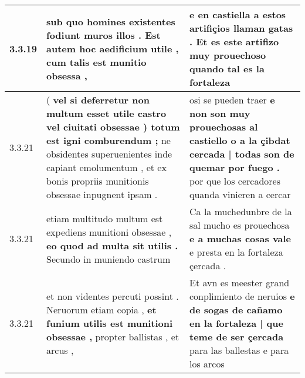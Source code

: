 \begin{tabular}{|p{1cm}|p{6.5cm}|p{6.5cm}|}
3.3.19 & sub quo homines existentes fodiunt muros illos . \textbf{ Est autem hoc aedificium utile , } cum talis est munitio obsessa , & e en castiella a estos artifiçios llaman gatas . \textbf{ Et es este artifizo muy prouechoso } quando tal es la fortaleza \\\hline
3.3.21 & ( \textbf{ vel si deferretur non multum esset utile castro vel ciuitati obsessae ) totum est igni comburendum ; } ne obsidentes superuenientes inde capiant emolumentum , et ex bonis propriis munitionis obsessae inpugnent ipsam . & osi se pueden traer \textbf{ e non son muy prouechosas al castiello o a la çibdat cercada | todas son de quemar por fuego . } por que los cercadores quanda vinieren a cercar \\\hline
3.3.21 & etiam multitudo multum est expediens munitioni obsessae , \textbf{ eo quod ad multa sit utilis . } Secundo in muniendo castrum & Ca la muchedunbre de la sal mucho es prouechosa \textbf{ e a muchas cosas vale } e presta en la fortaleza çercada . \\\hline
3.3.21 & et non videntes percuti possint . Neruorum etiam copia , \textbf{ et funium utilis est munitioni obsessae , } propter ballistas , et arcus , & Et avn es meester grand conplimiento de neruios \textbf{ e de sogas de cañamo en la fortaleza | que teme de ser çercada } para las ballestas e para los arcos \\\hline

\end{tabular}
